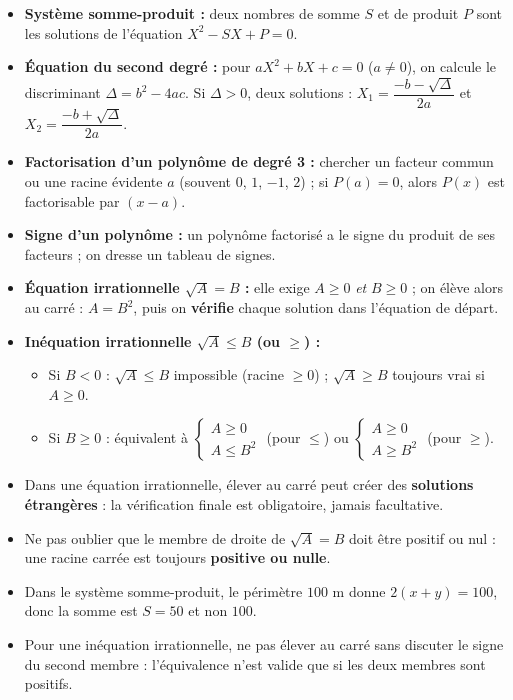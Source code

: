 \documentclass[11pt]{article}
\newcounter{popsec}
\newcounter{popsub}
\newcommand{\courssub}[1]{%
  \stepcounter{popsub}%
  \par\vspace{9pt}\noindent{\popxbold\fontsize{11.5}{13}\selectfont\color{popink}{\color{poporange}\thepopsec.\thepopsub}\hspace{6pt}#1}\par\nopagebreak\vspace{4pt}
}
\begin{document}
\courssub{Ressources à mobiliser}

\begin{aretenir}
\begin{itemize}
\item \textbf{Système somme-produit :} deux nombres de somme $S$ et de produit $P$ sont les solutions de l'équation $X^2 - SX + P = 0$.
\item \textbf{Équation du second degré :} pour $aX^2 + bX + c = 0$ ($a \neq 0$), on calcule le discriminant $\Delta = b^2 - 4ac$. Si $\Delta > 0$, deux solutions : $X_1 = \dfrac{-b - \sqrt{\Delta}}{2a}$ et $X_2 = \dfrac{-b + \sqrt{\Delta}}{2a}$.
\item \textbf{Factorisation d'un polynôme de degré 3 :} chercher un facteur commun ou une racine évidente $a$ (souvent $0$, $1$, $-1$, $2$) ; si $P(a) = 0$, alors $P(x)$ est factorisable par $(x - a)$.
\item \textbf{Signe d'un polynôme :} un polynôme factorisé a le signe du produit de ses facteurs ; on dresse un tableau de signes.
\item \textbf{Équation irrationnelle $\sqrt{A} = B$ :} elle exige $A \geq 0$ \emph{et} $B \geq 0$ ; on élève alors au carré : $A = B^2$, puis on \textbf{vérifie} chaque solution dans l'équation de départ.
\item \textbf{Inéquation irrationnelle $\sqrt{A} \leq B$ (ou $\geq$) :}
      \begin{itemize}
      \item Si $B < 0$ : $\sqrt{A} \leq B$ impossible (racine $\geq 0$) ; $\sqrt{A} \geq B$ toujours vrai si $A \geq 0$.
      \item Si $B \geq 0$ : équivalent à $\begin{cases} A \geq 0 \\ A \leq B^2 \end{cases}$ (pour $\leq$) ou $\begin{cases} A \geq 0 \\ A \geq B^2 \end{cases}$ (pour $\geq$).
      \end{itemize}
\end{itemize}
\end{aretenir}

\begin{attention}
\begin{itemize}
\item Dans une équation irrationnelle, élever au carré peut créer des \textbf{solutions étrangères} : la vérification finale est obligatoire, jamais facultative.
\item Ne pas oublier que le membre de droite de $\sqrt{A} = B$ doit être positif ou nul : une racine carrée est toujours \textbf{positive ou nulle}.
\item Dans le système somme-produit, le périmètre $100$ m donne $2(x+y) = 100$, donc la somme est $S = 50$ et non $100$.
\item Pour une inéquation irrationnelle, ne pas élever au carré sans discuter le signe du second membre : l'équivalence n'est valide que si les deux membres sont positifs.
\end{itemize}
\end{attention}
\end{document}
